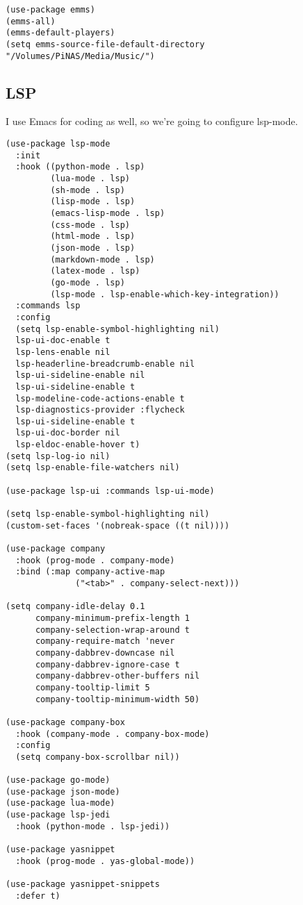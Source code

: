 \documentclass[11pt]{article}
\begin{document}
\begin{verbatim}
(use-package emms)
(emms-all)
(emms-default-players)
(setq emms-source-file-default-directory "/Volumes/PiNAS/Media/Music/")
\end{verbatim}

\subsection*{LSP}
\label{sec:orgbb04e0a}

I use Emacs for coding as well, so we're going to configure lsp-mode.

\begin{verbatim}
(use-package lsp-mode
  :init
  :hook ((python-mode . lsp)
         (lua-mode . lsp)
         (sh-mode . lsp)
         (lisp-mode . lsp)
         (emacs-lisp-mode . lsp)
         (css-mode . lsp)
         (html-mode . lsp)
         (json-mode . lsp)
         (markdown-mode . lsp)
         (latex-mode . lsp)
         (go-mode . lsp)
         (lsp-mode . lsp-enable-which-key-integration))
  :commands lsp
  :config
  (setq lsp-enable-symbol-highlighting nil)
  lsp-ui-doc-enable t
  lsp-lens-enable nil
  lsp-headerline-breadcrumb-enable nil
  lsp-ui-sideline-enable nil
  lsp-ui-sideline-enable t
  lsp-modeline-code-actions-enable t
  lsp-diagnostics-provider :flycheck
  lsp-ui-sideline-enable t
  lsp-ui-doc-border nil
  lsp-eldoc-enable-hover t)
(setq lsp-log-io nil)
(setq lsp-enable-file-watchers nil)

(use-package lsp-ui :commands lsp-ui-mode)

(setq lsp-enable-symbol-highlighting nil)
(custom-set-faces '(nobreak-space ((t nil))))

(use-package company
  :hook (prog-mode . company-mode)
  :bind (:map company-active-map
              ("<tab>" . company-select-next)))

(setq company-idle-delay 0.1
      company-minimum-prefix-length 1
      company-selection-wrap-around t
      company-require-match 'never
      company-dabbrev-downcase nil
      company-dabbrev-ignore-case t
      company-dabbrev-other-buffers nil
      company-tooltip-limit 5
      company-tooltip-minimum-width 50)

(use-package company-box
  :hook (company-mode . company-box-mode)
  :config
  (setq company-box-scrollbar nil))

(use-package go-mode)
(use-package json-mode)
(use-package lua-mode)
(use-package lsp-jedi
  :hook (python-mode . lsp-jedi))

(use-package yasnippet
  :hook (prog-mode . yas-global-mode))

(use-package yasnippet-snippets
  :defer t)
\end{verbatim}
\end{document}
